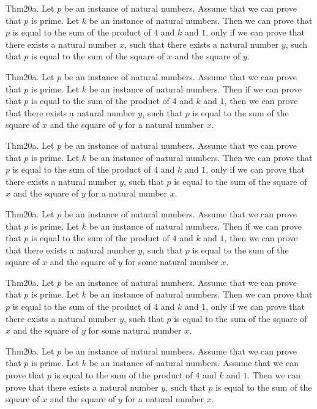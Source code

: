 \documentclass{article}
\begin{document}
Thm20a. Let $p$ be an instance of natural numbers. Assume that we can prove that $p$ is prime. Let $k$ be an instance of natural numbers. Then we can prove that $p$ is equal to the sum of the product of $4$ and $k$ and $1$, only if we can prove that there exists a natural number $x$, such that there exists a natural number $y$, such that $p$ is equal to the sum of the square of $x$ and the square of $y$.

Thm20a. Let $p$ be an instance of natural numbers. Assume that we can prove that $p$ is prime. Let $k$ be an instance of natural numbers. Then if we can prove that $p$ is equal to the sum of the product of $4$ and $k$ and $1$, then we can prove that there exists a natural number $y$, such that $p$ is equal to the sum of the square of $x$ and the square of $y$ for a natural number $x$.

Thm20a. Let $p$ be an instance of natural numbers. Assume that we can prove that $p$ is prime. Let $k$ be an instance of natural numbers. Then we can prove that $p$ is equal to the sum of the product of $4$ and $k$ and $1$, only if we can prove that there exists a natural number $y$, such that $p$ is equal to the sum of the square of $x$ and the square of $y$ for a natural number $x$.

Thm20a. Let $p$ be an instance of natural numbers. Assume that we can prove that $p$ is prime. Let $k$ be an instance of natural numbers. Then if we can prove that $p$ is equal to the sum of the product of $4$ and $k$ and $1$, then we can prove that there exists a natural number $y$, such that $p$ is equal to the sum of the square of $x$ and the square of $y$ for some natural number $x$.

Thm20a. Let $p$ be an instance of natural numbers. Assume that we can prove that $p$ is prime. Let $k$ be an instance of natural numbers. Then we can prove that $p$ is equal to the sum of the product of $4$ and $k$ and $1$, only if we can prove that there exists a natural number $y$, such that $p$ is equal to the sum of the square of $x$ and the square of $y$ for some natural number $x$.

Thm20a. Let $p$ be an instance of natural numbers. Assume that we can prove that $p$ is prime. Let $k$ be an instance of natural numbers. Assume that we can prove that $p$ is equal to the sum of the product of $4$ and $k$ and $1$. Then we can prove that there exists a natural number $y$, such that $p$ is equal to the sum of the square of $x$ and the square of $y$ for a natural number $x$.
\end{document}
